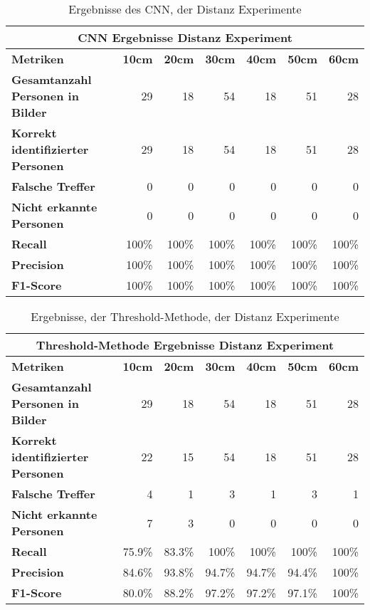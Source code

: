 {
	\renewcommand{\arraystretch}{1.3}
	\begin{table}[H]
		\centering
		\scriptsize
		\begin{tabularx}{.9\textwidth}{Xrrrrrr}
			\hline
			\multicolumn{7}{c}{\textbf{\gls{CNN} Ergebnisse Distanz Experiment}}\\
			\hline
			\textbf{Metriken} & \textbf{10cm} & \textbf{20cm} & \textbf{30cm} & \textbf{40cm} & \textbf{50cm} & \textbf{60cm}\\
			\hline 
			\textbf{Gesamtanzahl Personen in Bilder} & 29 & 18 & 54 & 18 & 51 & 28\\
			\hline
			\textbf{Korrekt identifizierter Personen} & 29 & 18 & 54 & 18 & 51 & 28\\
			\hline
			\textbf{Falsche Treffer} & 0 & 0 & 0 & 0 & 0 & 0\\
			\hline
			\textbf{Nicht erkannte Personen} & 0 & 0 & 0 & 0 & 0 & 0\\
			\hline
			\textbf{Recall} & 100\% & 100\% & 100\% & 100\% & 100\% & 100\%\\
			\hline  
			\textbf{Precision} & 100\% & 100\% & 100\% & 100\% & 100\% & 100\%\\
			\hline
			\textbf{F1-Score} & 100\% & 100\% & 100\% & 100\% & 100\% & 100\%\\
			\hline
		\end{tabularx}
		\caption{Ergebnisse des \gls{CNN}, der Distanz Experimente}
		\label{tbl:distanceCNN}
	\end{table}
	\begin{table}[H]
		\centering
		\scriptsize
		\begin{tabularx}{.9\textwidth}{Xrrrrrr}
			\hline
			\multicolumn{7}{c}{\textbf{Threshold-Methode Ergebnisse Distanz Experiment}}\\
			\hline
			\textbf{Metriken} & \textbf{10cm} & \textbf{20cm} & \textbf{30cm} & \textbf{40cm} & \textbf{50cm} & \textbf{60cm}\\
			\hline 
			\textbf{Gesamtanzahl Personen in Bilder} & 29 & 18 & 54 & 18 & 51 & 28\\
			\hline
			\textbf{Korrekt identifizierter Personen} & 22 & 15 & 54 & 18 & 51 & 28\\
			\hline
			\textbf{Falsche Treffer} & 4 & 1 & 3 & 1 & 3 & 1\\
			\hline
			\textbf{Nicht erkannte Personen} & 7 & 3 & 0 & 0 & 0 & 0\\
			\hline
			\textbf{Recall} & 75.9\% & 83.3\% & 100\% & 100\% & 100\% & 100\%\\
			\hline  
			\textbf{Precision} & 84.6\% & 93.8\% & 94.7\% & 94.7\% & 94.4\% & 100\%\\
			\hline
			\textbf{F1-Score} & 80.0\% & 88.2\% & 97.2\% & 97.2\% & 97.1\% & 100\%\\
			\hline
		\end{tabularx}
		\caption{Ergebnisse, der Threshold-Methode, der Distanz Experimente}
		\label{tbl:distanceThresh}
	\end{table}
}


